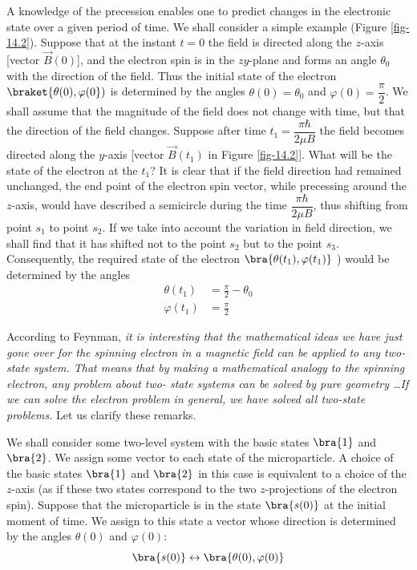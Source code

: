 \documentclass[a4paper,sfsidenotes,colorlinks=true]{tufte-book}
\numberwithin{equation}{section}
\numberwithin{figure}{section}
\begin{document}
A knowledge of the precession enables one to predict changes in the
electronic state over a given period of time. We shall consider a
simple example (Figure \ref{fig-14.2}). Suppose that at the instant $t
= 0$ the field is directed along the $z$-axis [vector $\vec{B} (0)$],
and the electron spin is in the $zy$-plane and forms an angle
$\theta_{0}$ with the direction of the field. Thus the initial state
of the electron $\braket{ \theta(0), \varphi(0})$ is determined by the
angles $\theta (0) = \theta_{0}$ and $\varphi (0) = \dfrac{\pi}{2}$. We
shall assume that the magnitude of the field does not change with
time, but that the direction of the field changes. Suppose after time
$t_{1} = \dfrac{\pi \hbar}{2 \mu B}$ the field becomes directed along
the $y$-axis [vector $\vec{B}(t_{1})$ in Figure \ref{fig-14.2}]. What
will be the state of the electron at the $t_{1}$? It is clear that if
the field direction had remained unchanged, the end point of the
electron spin vector, while precessing around the $z$-axis, would have
described a semicircle during the time $\dfrac{\pi \hbar}{2 \mu B}$,
thus shifting from point $s_{1}$ to point $s_{2}$. If we take into
account the variation in field direction, we shall find that it has
shifted not to the point $s_{2}$ but to the point
$s_{3}$. Consequently, the required state of the electron
$\bra{\theta(t_{1}), \varphi (t_{1})}$ ) would be determined by the
angles 
\begin{equation*}%
\begin{split} 
\theta (t_{1}) & = \frac{\pi}{2} - \theta_{0}\\
\varphi (t_{1}) & = \frac{\pi}{2} 
\end{split}
\end{equation*}

According to  Feynman, \emph{it
is interesting that the mathematical ideas we have just gone over for
the spinning electron in a magnetic field can be applied to any two-
state system. That means that by making a mathematical analogy to the
spinning electron, any problem about two- state systems can be solved
by pure geometry \ldots If we can solve the electron problem in general,
we have solved all two-state problems.}\cite{feynman1965b} Let us clarify these remarks.


We shall consider some two-level system with the basic states
$\bra{1}$ and $\bra{2}$. We assign some vector to each state of the
microparticle. A choice of the basic states $\bra{1}$ and $\bra{2}$ in
this case is equivalent to a choice of the $z$-axis (as if these two
states correspond to the two $z$-projections of the electron
spin). Suppose that the microparticle is in the state  $\bra{s(0)}$ at
the initial moment of time. We assign to this state a vector whose
direction is determined by the angles $\theta (0)$ and $\varphi (0)$:
\begin{equation}%
\bra{s(0)} \leftrightarrow \bra{\theta(0), \varphi (0)} 
\label{eq-14.18}
\end{equation}
\end{document}
